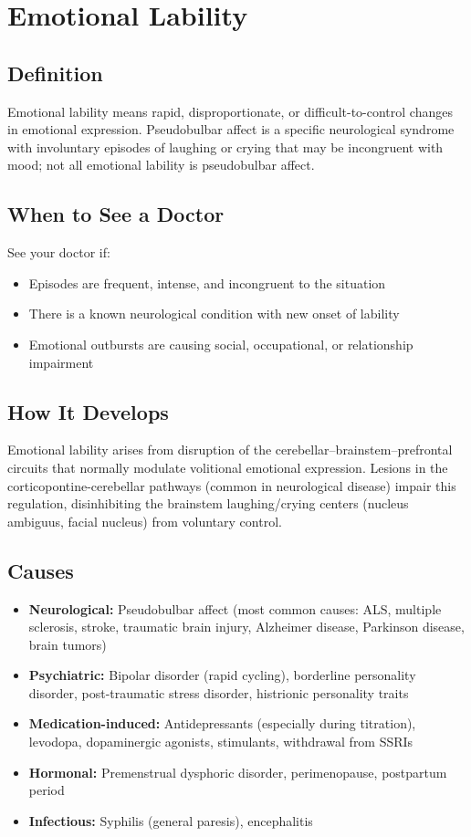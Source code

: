 \chapter{Emotional Lability}

\section*{Definition}
Emotional lability means rapid, disproportionate, or difficult-to-control changes in emotional expression. Pseudobulbar affect is a specific neurological syndrome with involuntary episodes of laughing or crying that may be incongruent with mood; not all emotional lability is pseudobulbar affect.

\section*{When to See a Doctor}
See your doctor if:
\begin{itemize}
  \item Episodes are frequent, intense, and incongruent to the situation
  \item There is a known neurological condition with new onset of lability
  \item Emotional outbursts are causing social, occupational, or relationship impairment
\end{itemize}

\section*{How It Develops}
Emotional lability arises from disruption of the cerebellar--brainstem--prefrontal circuits that normally modulate volitional emotional expression. Lesions in the corticopontine-cerebellar pathways (common in neurological disease) impair this regulation, disinhibiting the brainstem laughing/crying centers (nucleus ambiguus, facial nucleus) from voluntary control.

\section*{Causes}
\begin{itemize}
  \item \textbf{Neurological:} Pseudobulbar affect (most common causes: ALS, multiple sclerosis, stroke, traumatic brain injury, Alzheimer disease, Parkinson disease, brain tumors)
  \item \textbf{Psychiatric:} Bipolar disorder (rapid cycling), borderline personality disorder, post-traumatic stress disorder, histrionic personality traits
  \item \textbf{Medication-induced:} Antidepressants (especially during titration), levodopa, dopaminergic agonists, stimulants, withdrawal from SSRIs
  \item \textbf{Hormonal:} Premenstrual dysphoric disorder, perimenopause, postpartum period
  \item \textbf{Infectious:} Syphilis (general paresis), encephalitis
\end{itemize}

